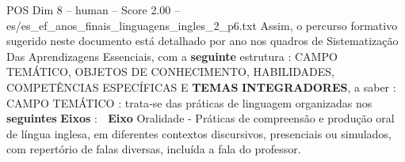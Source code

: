 \begin{textsample}{POS Dim 8 – human – Score 2.00 – es/es\_ef\_anos\_finais\_linguagens\_ingles\_2\_p6.txt}  \label{ex:f8_pos_012}
Assim, o percurso formativo sugerido neste documento está detalhado por ano nos quadros de Sistematização Das Aprendizagens Essenciais, com a \textbf{seguinte} estrutura : CAMPO TEMÁTICO, OBJETOS DE CONHECIMENTO, HABILIDADES, COMPETÊNCIAS ESPECÍFICAS E \textbf{TEMAS} \textbf{INTEGRADORES}, a saber :  CAMPO TEMÁTICO : trata‐se das práticas de linguagem organizadas nos \textbf{seguintes} \textbf{Eixos} :  \textbf{Eixo} Oralidade - Práticas de compreensão e produção oral de língua inglesa, em diferentes contextos discursivos, presenciais ou simulados, com repertório de falas diversas, incluída a fala do professor.

\end{textsample}
